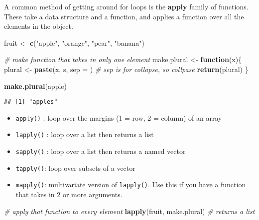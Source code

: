 \documentclass[
]{book}
\newenvironment{Shaded}{\begin{snugshade}}{\end{snugshade}}
\newcommand{\CommentTok}[1]{\textcolor[rgb]{0.56,0.35,0.01}{\textit{#1}}}
\newcommand{\ControlFlowTok}[1]{\textcolor[rgb]{0.13,0.29,0.53}{\textbf{#1}}}
\newcommand{\DataTypeTok}[1]{\textcolor[rgb]{0.13,0.29,0.53}{#1}}
\newcommand{\KeywordTok}[1]{\textcolor[rgb]{0.13,0.29,0.53}{\textbf{#1}}}
\newcommand{\NormalTok}[1]{#1}
\newcommand{\StringTok}[1]{\textcolor[rgb]{0.31,0.60,0.02}{#1}}
\providecommand{\tightlist}{%
  \setlength{\itemsep}{0pt}\setlength{\parskip}{0pt}}
\begin{document}
A common method of getting around for loops is the \textbf{apply} family of functions. These take a data structure and a function, and applies a function over all the elements in the object.

\begin{Shaded}
\begin{Highlighting}[]
\NormalTok{fruit \textless{}{-}}\StringTok{ }\KeywordTok{c}\NormalTok{(}\StringTok{"apple"}\NormalTok{, }\StringTok{"orange"}\NormalTok{, }\StringTok{"pear"}\NormalTok{, }\StringTok{"banana"}\NormalTok{)}

\CommentTok{\# make function that takes in only one element}
\NormalTok{make.plural \textless{}{-}}\StringTok{ }\ControlFlowTok{function}\NormalTok{(x)\{}
\NormalTok{   plural \textless{}{-}}\StringTok{ }\KeywordTok{paste}\NormalTok{(x, }\StringTok{\textquotesingle{}s\textquotesingle{}}\NormalTok{, }\DataTypeTok{sep =} \StringTok{\textquotesingle{}\textquotesingle{}}\NormalTok{) }\CommentTok{\# sep is for collapse, so collpase \textquotesingle{}\textquotesingle{}}
   \KeywordTok{return}\NormalTok{(plural)}
\NormalTok{\}}

\KeywordTok{make.plural}\NormalTok{(}\StringTok{\textquotesingle{}apple\textquotesingle{}}\NormalTok{)}
\end{Highlighting}
\end{Shaded}

\begin{verbatim}
## [1] "apples"
\end{verbatim}

\begin{itemize}
\tightlist
\item
  \texttt{apply()} : loop over the margins (1 = row, 2 = column) of an array
\item
  \texttt{lapply()} : loop over a list then returns a list
\item
  \texttt{sapply()} : loop over a list then returns a named vector
\item
  \texttt{tapply()}: loop over subsets of a vector
\item
  \texttt{mapply()}: multivariate version of \texttt{lapply()}. Use this if you have a function that takes in 2 or more arguments.
\end{itemize}

\begin{Shaded}
\begin{Highlighting}[]
\CommentTok{\# apply that function to every element}
\KeywordTok{lapply}\NormalTok{(fruit, make.plural) }\CommentTok{\# returns a list}
\end{Highlighting}
\end{Shaded}
\end{document}

